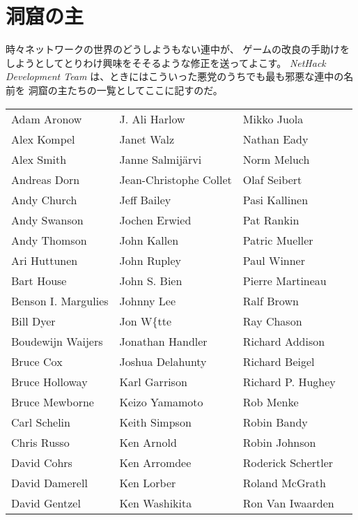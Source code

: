 \section*{洞窟の主}
\nd 時々ネットワークの世界のどうしようもない連中が、
ゲームの改良の手助けをしようとしてとりわけ興味をそそるような修正を送ってよこす。
{\it NetHack Development Team} は、ときにはこういった悪党のうちでも最も邪悪な連中の名前を
洞窟の主たちの一覧としてここに記すのだ。
\begin{center}
\begin{tabular}{llll}
Adam Aronow & J. Ali Harlow & Mikko Juola\\
Alex Kompel & Janet Walz & Nathan Eady\\
Alex Smith & Janne Salmij\"{a}rvi & Norm Meluch\\
Andreas Dorn & Jean-Christophe Collet & Olaf Seibert\\
Andy Church & Jeff Bailey & Pasi Kallinen\\
Andy Swanson & Jochen Erwied & Pat Rankin\\
Andy Thomson & John Kallen & Patric Mueller\\
Ari Huttunen & John Rupley & Paul Winner\\
Bart House & John S. Bien & Pierre Martineau\\
Benson I. Margulies & Johnny Lee & Ralf Brown\\
Bill Dyer & Jon W\{tte & Ray Chason\\
Boudewijn Waijers & Jonathan Handler & Richard Addison\\
Bruce Cox & Joshua Delahunty & Richard Beigel\\
Bruce Holloway & Karl Garrison & Richard P. Hughey\\
Bruce Mewborne & Keizo Yamamoto & Rob Menke\\
Carl Schelin & Keith Simpson & Robin Bandy\\
Chris Russo & Ken Arnold & Robin Johnson\\
David Cohrs & Ken Arromdee & Roderick Schertler\\
David Damerell & Ken Lorber & Roland McGrath\\
David Gentzel & Ken Washikita & Ron Van Iwaarden\\

\end{tabular}
\end{center}
